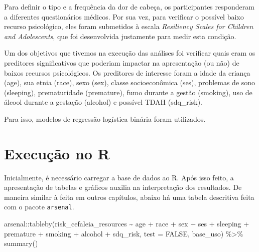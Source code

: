 \documentclass[
]{book}
\newenvironment{Shaded}{\begin{snugshade}}{\end{snugshade}}
\newcommand{\AttributeTok}[1]{\textcolor[rgb]{0.77,0.63,0.00}{#1}}
\newcommand{\ConstantTok}[1]{\textcolor[rgb]{0.00,0.00,0.00}{#1}}
\newcommand{\FunctionTok}[1]{\textcolor[rgb]{0.00,0.00,0.00}{#1}}
\newcommand{\NormalTok}[1]{#1}
\newcommand{\SpecialCharTok}[1]{\textcolor[rgb]{0.00,0.00,0.00}{#1}}
\begin{document}
Para definir o tipo e a frequência da dor de cabeça, os participantes responderam a diferentes questionários médicos. Por sua vez, para verificar o possível baixo recurso psicológico, eles foram submetidos à escala \emph{Resiliency Scales for Children and Adolescents}, que foi desenvolvida justamente para medir esta condição.

Um dos objetivos que tivemos na execução das análises foi verificar quais eram os preditores significativos que poderiam impactar na apresentação (ou não) de baixos recursos psicológicos. Os preditores de interesse foram a idade da criança (age), sua etnia (race), sexo (sex), classe socioeconômica (ses), problemas de sono (sleeping), prematuridade (premature), fumo durante a gestão (smoking), uso de álcool durante a gestação (alcohol) e possível TDAH (sdq\_risk).

Para isso, modelos de regressão logística binária foram utilizados.

\hypertarget{execuuxe7uxe3o-no-r-16}{%
\section{Execução no R}\label{execuuxe7uxe3o-no-r-16}}

Inicialmente, é necessário carregar a base de dados ao R. Após isso feito, a apresentação de tabelas e gráficos auxilia na interpretação dos resultados. De maneira similar à feita em outros capítulos, abaixo há uma tabela descritiva feita com o pacote \texttt{arsenal}.

\begin{Shaded}
\begin{Highlighting}[]
\NormalTok{arsenal}\SpecialCharTok{::}\FunctionTok{tableby}\NormalTok{(risk\_cefaleia\_resources }\SpecialCharTok{\textasciitilde{}} 
\NormalTok{                   age }\SpecialCharTok{+}\NormalTok{ race }\SpecialCharTok{+}\NormalTok{  sex }\SpecialCharTok{+}\NormalTok{ ses }\SpecialCharTok{+}\NormalTok{ sleeping }\SpecialCharTok{+}\NormalTok{ premature }\SpecialCharTok{+} 
\NormalTok{                   smoking }\SpecialCharTok{+}\NormalTok{ alcohol }\SpecialCharTok{+}\NormalTok{ sdq\_risk, }
                 \AttributeTok{test =} \ConstantTok{FALSE}\NormalTok{,}
\NormalTok{                 base\_uso) }\SpecialCharTok{\%\textgreater{}\%} 
  \FunctionTok{summary}\NormalTok{() }
\end{Highlighting}
\end{Shaded}
\end{document}
